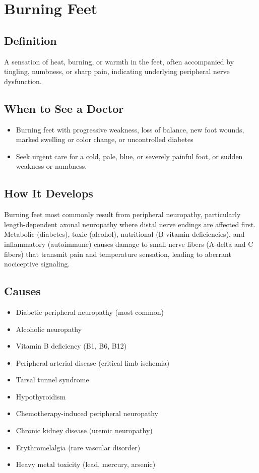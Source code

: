 \chapter{Burning Feet}

\section*{Definition}
A sensation of heat, burning, or warmth in the feet, often accompanied by tingling, numbness, or sharp pain, indicating underlying peripheral nerve dysfunction.

\section*{When to See a Doctor}

\begin{itemize}
 \item Burning feet with progressive weakness, loss of balance, new foot wounds, marked swelling or color change, or uncontrolled diabetes
 \item Seek urgent care for a cold, pale, blue, or severely painful foot, or sudden weakness or numbness.
\end{itemize}

\section*{How It Develops}
Burning feet most commonly result from peripheral neuropathy, particularly length-dependent axonal neuropathy where distal nerve endings are affected first. Metabolic (diabetes), toxic (alcohol), nutritional (B vitamin deficiencies), and inflammatory (autoimmune) causes damage to small nerve fibers (A-delta and C fibers) that transmit pain and temperature sensation, leading to aberrant nociceptive signaling.

\section*{Causes}
\begin{itemize}
 \item Diabetic peripheral neuropathy (most common)
 \item Alcoholic neuropathy
 \item Vitamin B deficiency (B1, B6, B12)
 \item Peripheral arterial disease (critical limb ischemia)
 \item Tarsal tunnel syndrome
 \item Hypothyroidism
 \item Chemotherapy-induced peripheral neuropathy
 \item Chronic kidney disease (uremic neuropathy)
 \item Erythromelalgia (rare vascular disorder)
 \item Heavy metal toxicity (lead, mercury, arsenic)
\end{itemize}

